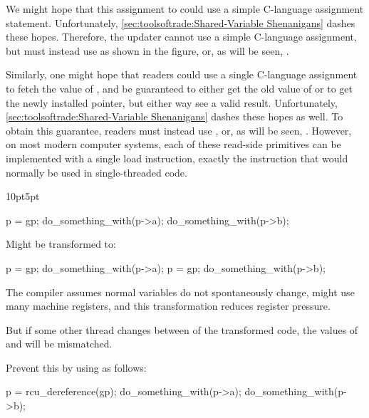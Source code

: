 We might hope that this assignment to  could use a simple
C-language assignment statement.
Unfortunately,
\cref{sec:toolsoftrade:Shared-Variable Shenanigans}
dashes these hopes.
Therefore, the updater cannot use a simple C-language assignment, but
must instead use  as shown in the figure,
or, as will be seen, .

Similarly, one might hope that readers could use a single C-language
assignment to fetch the value of , and be guaranteed to either
get the old value of  or to get the newly installed pointer,
but either way see a valid result.
Unfortunately, \cref{sec:toolsoftrade:Shared-Variable Shenanigans}
dashes these hopes as well.
To obtain this guarantee, readers must instead use ,
or, as will be seen, .
However, on most modern computer systems, each of these read-side primitives
can be implemented with a single load instruction, exactly the instruction
that would normally be used in single-threaded code.

\begin{listing}[tb]
\begin{adjustwidth}{10pt}{5pt}
\footnotesize
\renewcommand{\myfvline}{A\arabic{FancyVerbLine}}
\begin{fcvlabel}
\begin{VerbatimT}[commandchars=\\\[\]]
 p = gp;				\lnlbl[A1]
 do_something_with(p->a);		\lnlbl[A2]
 do_something_with(p->b);		\lnlbl[A3]
\end{VerbatimT}
Might be transformed to:
\renewcommand{\myfvline}{B\arabic{FancyVerbLine}}
\begin{VerbatimT}[commandchars=\\\[\]]
 p = gp;				\lnlbl[B1]
 do_something_with(p->a);		\lnlbl[B2]
 p = gp;				\lnlbl[B3]
 do_something_with(p->b);		\lnlbl[B4]
\end{VerbatimT}
The compiler assumes normal variables do not spontaneously change,
 might use many machine registers, and this
transformation reduces register pressure.
\begin{fcvref}
But if some other thread changes  between  of the
transformed code, the values of  and  will be mismatched.
\end{fcvref}
Prevent this by using  as follows:
\renewcommand{\myfvline}{C\arabic{FancyVerbLine}}
\begin{VerbatimT}[commandchars=\\\[\]]
 p = rcu_dereference(gp);		\lnlbl[C1]
 do_something_with(p->a);		\lnlbl[C2]
 do_something_with(p->b);		\lnlbl[C3]
\end{VerbatimT}
\end{fcvlabel}
\end{adjustwidth}
\caption{Compilers Can Reload Values}
\label{lst:defer:Compilers Can Reload Values}
\end{listing}

